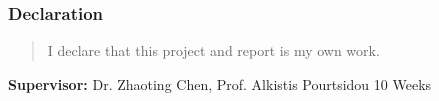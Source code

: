 \documentclass[
    a4paper, %
    10pt, %
]{LTJournalArticle}
\begin{document}
\vspace*{1cm}

\subsubsection*{Declaration}

\begin{quotation}
  I declare that this project and report is my own work.
\end{quotation}

\vspace*{2cm}

\vfill
{\bf Supervisor:} Dr. Zhaoting Chen, Prof. Alkistis Pourtsidou                 %
\hfill
10 Weeks                                         %
\newpage



\newpage
\thispagestyle{empty} %
\date{}
\newpage

\setcounter{page}{1} %
\twocolumn




%

%





\renewcommand{\refname}{Bibliography}
\printbibliography

\onecolumn
\appendix
{}
%

\newpage
\end{document}
